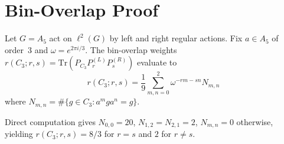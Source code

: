 \documentclass[11pt,a4paper]{article}
\newcommand{\Tr}{\mathrm{Tr}}
\theoremstyle{remark}
\begin{document}
\section{Bin-Overlap Proof}
\label{app:bin}

Let $G = A_5$ act on $\ell^2(G)$ by left and right regular actions.
Fix $a \in A_5$ of order~3 and $\omega = e^{2\pi i/3}$.  The bin-overlap
weights $r(C_3; r, s) = \Tr(P_{C_3} P_r^{(L)} P_s^{(R)})$ evaluate to
\[
r(C_3; r, s) = \frac{1}{9}\sum_{m,n=0}^{2} \omega^{-rm - sn} N_{m,n}
\]
where $N_{m,n} = \#\{g \in C_3 : a^m g a^n = g\}$.

Direct computation gives $N_{0,0} = 20$, $N_{1,2} = N_{2,1} = 2$,
$N_{m,n} = 0$ otherwise, yielding
$r(C_3; r, s) = 8/3$ for $r = s$ and $2$ for $r \neq s$.
\end{document}
